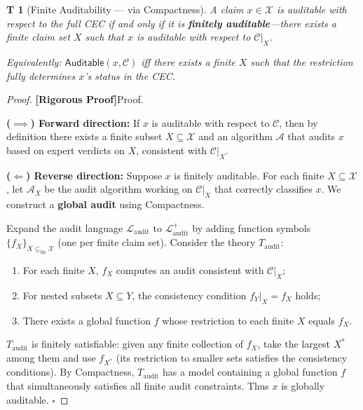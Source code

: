 \documentclass[12pt,a4paper]{article}
\newtheorem{theorem}Theorem[section]
\theoremstyle{remark}
\newcommand{\CEC}{\mathcal{C}}
\newcommand{\ClaimSpace}{\mathcal{X}}
\newcommand{\Lang}{\mathcal{L}}
\newcommand{\rigorous}{\textnormal{\textbf{[Rigorous Proof]}}}
\begin{document}
\begin{theorem}[Finite Auditability --- via Compactness]\label{thm:finite_auditability}
A claim \(x \in \ClaimSpace\) is auditable with respect to the full CEC if and only if it is \textbf{finitely auditable}---there exists a finite claim set \(X\) such that \(x\) is auditable with respect to \(\CEC|_X\).

Equivalently: \(\mathsf{Auditable}(x, \CEC)\) iff there exists a finite \(X\) such that the restriction fully determines \(x\)'s status in the CEC.
\end{theorem}
\begin{proof}
\rigorous Proof.

\textbf{(\(\implies\)) Forward direction:} If \(x\) is auditable with respect to \(\CEC\), then by definition there exists a finite subset \(X \subseteq \ClaimSpace\) and an algorithm \(\mathcal{A}\) that audits \(x\) based on expert verdicts on \(X\), consistent with \(\CEC|_X\).

\textbf{(\(\Longleftarrow\)) Reverse direction:} Suppose \(x\) is finitely auditable. For each finite \(X \subseteq \ClaimSpace\), let \(\mathcal{A}_X\) be the audit algorithm working on \(\CEC|_X\) that correctly classifies \(x\). We construct a \textbf{global audit} using Compactness.

Expand the audit language \(\Lang_{\mathrm{audit}}\) to \(\Lang_{\mathrm{audit}}^+\) by adding function symbols \(\{f_X\}_{X \subseteq_{\mathrm{fin}} \ClaimSpace}\) (one per finite claim set). Consider the theory \(T_{\mathrm{audit}}\):
\begin{enumerate}[label=(\arabic*),itemsep=2pt]
    \item For each finite \(X\), \(f_X\) computes an audit consistent with \(\CEC|_X\);
    \item For nested subsets \(X \subseteq Y\), the consistency condition \(f_Y|_X = f_X\) holds;
    \item There exists a global function \(f\) whose restriction to each finite \(X\) equals \(f_X\).
\end{enumerate}

\(T_{\mathrm{audit}}\) is finitely satisfiable: given any finite collection of \(f_X\), take the largest \(X^*\) among them and use \(f_{X^*}\) (its restriction to smaller sets satisfies the consistency conditions). By Compactness, \(T_{\mathrm{audit}}\) has a model containing a global function \(f\) that simultaneously satisfies all finite audit constraints. Thus \(x\) is globally auditable. \(\square\)
\end{proof}
\end{document}
